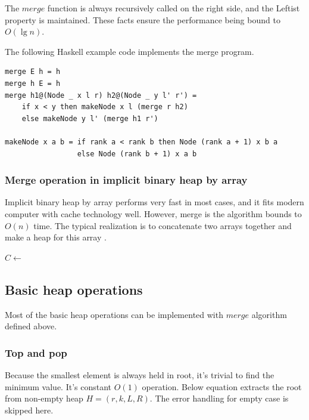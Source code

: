\documentclass[b5paper]{article}
\begin{document}
The $merge$ function is always recursively called on the right side,
and the Leftist property is maintained. These facts ensure the performance
being bound to $O(\lg n)$.

The following Haskell example code implements the merge program.

\lstset{language=Haskell}
\begin{lstlisting}
merge E h = h
merge h E = h
merge h1@(Node _ x l r) h2@(Node _ y l' r') =
    if x < y then makeNode x l (merge r h2)
    else makeNode y l' (merge h1 r')

makeNode x a b = if rank a < rank b then Node (rank a + 1) x b a
                 else Node (rank b + 1) x a b
\end{lstlisting}

\subsubsection{Merge operation in implicit binary heap by array}

Implicit binary heap by array performs very fast in most cases, and
it fits modern computer with cache technology well. However, merge
is the algorithm bounds to $O(n)$ time. The typical realization is to
concatenate two arrays together and make a heap for this array \cite{NIST}.

\begin{algorithmic}[1]
  \State $C \gets$ 
  \State {}
\EndFunction
\end{algorithmic}

\subsection{Basic heap operations}

Most of the basic heap operations can be implemented with $merge$
algorithm defined above.

\subsubsection{Top and pop}
Because the smallest element is always held in root, it's trivial
to find the minimum value. It's constant $O(1)$ operation. Below
equation extracts the root from non-empty heap $H = (r, k, L, R)$.
The error handling for empty case is skipped here.
\end{document}
